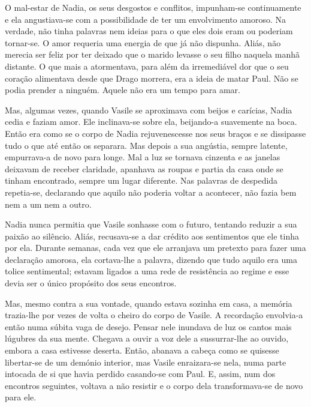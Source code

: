 O mal-estar de Nadia, os seus desgostos e conflitos, impunham-se
continuamente e ela angustiava-se com a possibilidade de ter um
envolvimento amoroso. Na verdade, não tinha palavras nem ideias para o
que eles dois eram ou poderiam tornar-se. O amor requeria uma energia de
que já não dispunha. Aliás, não merecia ser feliz por ter deixado que o
marido levasse o seu filho naquela manhã distante. O que mais a
atormentava, para além da irremediável dor que o seu coração
alimentava desde que Drago morrera, era a ideia de matar Paul. Não se
podia prender a ninguém. Aquele não era um tempo para amar.

Mas, algumas vezes, quando Vasile se aproximava com beijos e carícias,
Nadia cedia e faziam amor. Ele inclinava-se sobre ela, beijando-a suavemente na boca. Então era como se o corpo
de Nadia rejuvenescesse nos seus braços e se dissipasse tudo o que até
então os separara. Mas depois a sua angústia, sempre latente,
empurrava-a de novo para longe. Mal a luz se tornava cinzenta e as
janelas deixavam de receber claridade, apanhava as roupas e partia da
casa onde se tinham encontrado, sempre um lugar diferente. Nas palavras
de despedida repetia-se, declarando que aquilo não poderia voltar a
acontecer, não fazia bem nem a um nem a outro.


Nadia nunca permitia que Vasile sonhasse com o futuro, tentando reduzir
a sua paixão ao silêncio. Aliás, recusava-se a dar crédito aos sentimentos que ele tinha por ela. Durante
semanas, cada vez que ele arranjava um pretexto para fazer uma
declaração amorosa, ela cortava-lhe a palavra, dizendo que tudo aquilo
era uma tolice sentimental; estavam ligados a uma rede de resistência
ao regime e esse devia ser o único propósito dos seus encontros.

Mas, mesmo contra a sua vontade, quando estava sozinha em casa, a
memória trazia-lhe por vezes de volta o cheiro do corpo de Vasile. A
recordação envolvia-a então numa súbita vaga de desejo. Pensar nele
inundava de luz os cantos mais lúgubres da sua mente. Chegava a ouvir a
voz dele a sussurrar-lhe ao ouvido, embora a casa estivesse deserta.
Então, abanava a cabeça como se quisesse libertar-se de um demónio interior, mas Vasile enraizara-se nela, numa parte
intocada de si que havia perdido casando-se com Paul. E, assim, num dos
encontros seguintes, voltava a não resistir e o corpo dela
transformava-se de novo para ele.


